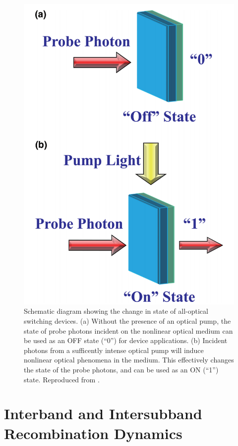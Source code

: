 \begin{figure}[ht]
	\centering
	\includegraphics[scale=0.2]{images/chapter_prior_works/optical_switching_chai_2017}
	\caption{Schematic diagram showing the change in state of all-optical switching devices. (a) Without the presence of an optical pump, the state of probe photons incident on the nonlinear optical medium can be used as an OFF state (``0'') for device applications. (b) Incident photons from a sufficently intense optical pump will induce nonlinear optical phenomena in the medium. This effectively changes the state of the probe photons, and can be used as an ON (``1'') state. Reproduced from \cite{chai2017ultrafast}.}
	\label{fig:optical_switch_chai_2017}
\end{figure}

\section{Interband and Intersubband Recombination Dynamics}

